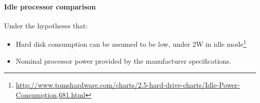         \paragraph*{Idle processor comparison}
            Under the hypotheses that: 
            
        \begin{itemize}
            \item Hard disk consumption can be assumed to be low, under 2W in idle mode\footnote{\url{http://www.tomshardware.com/charts/2.5-hard-drive-charts/Idle-Power-Consumption,681.html}}
            \item Nominal processor power provided by the manufacturer specifications.
        \end{itemize}
        
            
